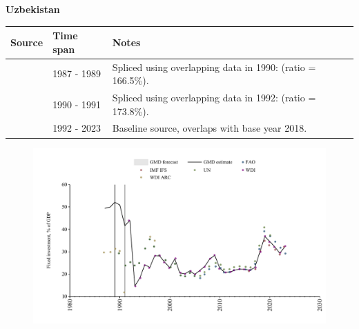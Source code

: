 \documentclass[12pt,a4paper,landscape]{article}
\begin{document}
\begin{adjustbox}{max totalsize={\paperwidth}{\paperheight},center}
\begin{minipage}[t][\textheight][t]{\textwidth}
\vspace*{0.5cm}
{}
\begin{center}
{\Large\bfseries Uzbekistan}
\end{center}
\vspace{0.5cm}
\begin{table}[H]
\centering
\small
\begin{tabular}{|l|l|l|}
\hline
\textbf{Source} & \textbf{Time span} & \textbf{Notes} \\
\hline
\rowcolor{white}\cite{WDI_ARC}& 1987 - 1989 &Spliced using overlapping data in 1990: (ratio = 166.5\%).\\
\rowcolor{lightgray}\cite{UN}& 1990 - 1991 &Spliced using overlapping data in 1992: (ratio = 173.8\%).\\
\rowcolor{white}\cite{WDI}& 1992 - 2023 &Baseline source, overlaps with base year 2018.\\
\hline
\end{tabular}
\end{table}
\begin{figure}[H]
\centering
\includegraphics[width=\textwidth,height=0.6\textheight,keepaspectratio]{graphs/UZB_finv_GDP.pdf}
\end{figure}
\end{minipage}
\end{adjustbox}
\end{document}
